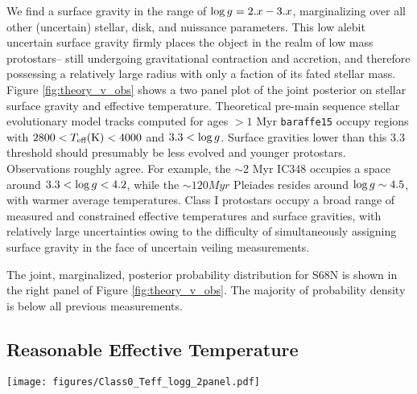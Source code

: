 \documentclass[twocolumn]{emulateapj}%
\begin{document}
We find a surface gravity in the range of $\log g = 2.x-3.x$, marginalizing over all other (uncertain) stellar, disk, and nuissance parameters.  This low alebit uncertain surface gravity firmly places the object in the realm of low mass protostars-- still undergoing gravitational contraction and accretion, and therefore possessing a relatively large radius with only a faction of its fated stellar mass.  Figure \ref{fig:theory_v_obs} shows a two panel plot of the joint posterior on stellar surface gravity and effective temperature.  Theoretical pre-main sequence stellar evolutionary model tracks computed for ages $>1$ Myr \texttt{baraffe15} occupy regions with $2800 < T_\textrm{eff} (\mathrm{K}) < 4000$ and $3.3<\log g$.  Surface gravities lower than this 3.3 threshold should presumably be less evolved and younger protostars.  Observations roughly agree.  For example, the $\sim 2$ Myr IC348 occupies a space around $3.3 < \log g <4.2$, while the $\sim 120 Myr$ Pleiades resides around $\log g\sim 4.5$, with warmer average temperatures.  Class I protostars \citep{2005AJ....130.1145D} occupy a broad range of measured and constrained effective temperatures and surface gravities, with relatively large uncertainties owing to the difficulty of simultaneously assigning surface gravity in the face of uncertain veiling measurements. 

The joint, marginalized, posterior probability distribution for S68N is shown in the right panel of Figure \ref{fig:theory_v_obs}.  The majority of probability density is below all previous measurements.

\subsection{Reasonable Effective Temperature}

\begin{figure*}[b]
 \centering
 \texttt{[image: figures/Class0\_Teff\_logg\_2panel.pdf]}
 \caption{Pre-main sequence and protostar evolution comparison between theory (left panel) and obseration (right panel).  The 0.02$-$1.2 $M_{\odot}$ evolutionary model tracks are from \citet{baraffe15}, spanning 1 Myr to 100 Myr isochrones; protostars are expected to sit below the 1 Myr isochrone in the region of parameter space demarcated with a yellow dashed ellipse.  The observations show coarse agreement with the models-- measurements of the Pleiades from \citet[green KDE]{cottaar14} cluster around the 100 Myr isochrone, although extend into higher-than-predicted $\log{g}$ for hotter stars.  The younger IC348 sources \citep[purple KDE]{cottaar14} cluster with a large spread above and below the $\sim10$ Myr isochrone.  The source S 68N has a broad posterior PDF placing its maximum a-posteriori estimate inside the range of protostars.  The black dots are Class I protostars from \citet{2005AJ....130.1145D}, showing a large range in measured properties with relatively large uncertainties in $\log{g}$.}  
 \label{fig:theory_v_obs}
\end{figure*}
\end{document}
